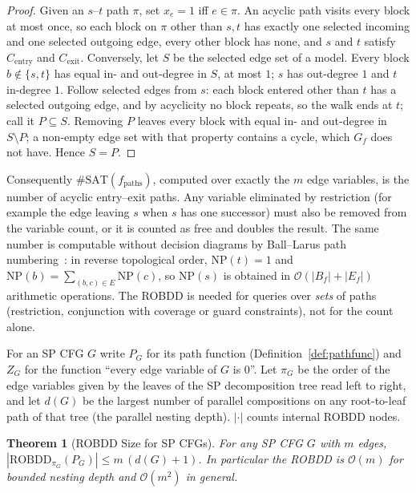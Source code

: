 \documentclass[journal,10pt,twoside]{IEEEtran}
\newtheorem{theorem}{Theorem}[section]
\newcommand{\ROBDD}{\mathrm{ROBDD}}
\newcommand{\SATC}{\#\mathrm{SAT}}
\newcommand{\BigO}{\mathcal{O}}
\begin{document}
\begin{proof}
Given an $s$--$t$ path $\pi$, set $x_e = 1$ iff $e \in \pi$.
An acyclic path visits every block at most once, so each
block on $\pi$ other than $s,t$ has exactly one selected
incoming and one selected outgoing edge, every other block has
none, and $s$ and $t$ satisfy $C_{\mathrm{entry}}$ and
$C_{\mathrm{exit}}$.  Conversely, let $S$ be the selected edge
set of a model.  Every block $b \notin\{s,t\}$ has equal
in- and out-degree in $S$, at most $1$; $s$ has out-degree $1$
and $t$ in-degree $1$.  Follow selected edges from $s$: each
block entered other than $t$ has a selected outgoing edge, and
by acyclicity no block repeats, so the walk ends at $t$; call
it $P \subseteq S$.  Removing $P$ leaves every block with equal
in- and out-degree in $S \setminus P$; a non-empty edge set
with that property contains a cycle, which $G_f$ does not
have.  Hence $S = P$.
\end{proof}

Consequently $\SATC(f_{\mathrm{paths}})$, computed over
exactly the $m$ edge variables, is the number of acyclic
entry--exit paths.  Any variable eliminated by restriction
(for example the edge leaving $s$ when $s$ has one successor)
must also be removed from the variable count, or it is counted
as free and doubles the result.  The same number is computable
without decision diagrams by Ball--Larus path
numbering~\cite{balllarus96}: in reverse topological order,
$\mathrm{NP}(t) = 1$ and $\mathrm{NP}(b) = \sum_{(b,c)\in E}
\mathrm{NP}(c)$, so $\mathrm{NP}(s)$ is obtained in
$\BigO(|B_f| + |E_f|)$ arithmetic operations.  The ROBDD is
needed for queries over \emph{sets} of paths (restriction,
conjunction with coverage or guard constraints), not for the
count alone.

For an SP CFG $G$ write $P_G$ for its path function
(Definition~\ref{def:pathfunc}) and $Z_G$ for the function
``every edge variable of $G$ is $0$''.  Let $\pi_G$ be the
order of the edge variables given by the leaves of the SP
decomposition tree read left to right, and let $d(G)$ be the
largest number of parallel compositions on any root-to-leaf
path of that tree (the parallel nesting depth).  $|\cdot|$
counts internal ROBDD nodes.

\begin{theorem}[ROBDD Size for SP CFGs]\label{thm:robdd}
For any SP CFG $G$ with $m$ edges,
$|\ROBDD_{\pi_G}(P_G)| \le m\,(d(G)+1)$.  In particular the
ROBDD is $\BigO(m)$ for bounded nesting depth and
$\BigO(m^2)$ in general.
\end{theorem}
\end{document}
